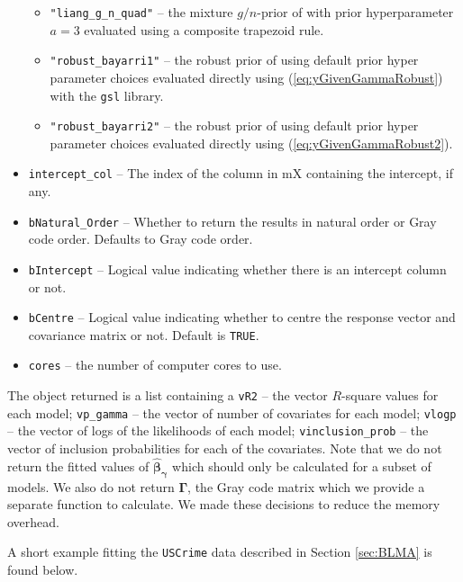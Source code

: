 \documentclass[12pt]{article}
\def\vectorfonttwo{\boldsymbol}
\def\vbeta{{\vectorfonttwo \beta}}               %
\def\vgamma{{\vectorfonttwo \gamma}}             %
\def\matrixfonttwo{\boldsymbol}
\def\mGamma{{\matrixfonttwo \Gamma}}             %
\begin{document}
\begin{itemize}
\begin{itemize}
		\item {\tt "liang\_g\_n\_quad"} -- the mixture $g/n$-prior of \cite{Liang2008} with prior hyperparameter $a=3$ evaluated using a composite trapezoid rule.
		
		\item {\tt "robust\_bayarri1"} -- the robust prior of \cite{Bayarri2012}
		using default prior hyper parameter choices evaluated directly using 
		(\ref{eq:yGivenGammaRobust}) with the {\tt gsl} library.
		
		\item {\tt "robust\_bayarri2"} -- the robust prior of \cite{Bayarri2012}
		using default prior hyper parameter choices evaluated directly using 
		(\ref{eq:yGivenGammaRobust2}).
	
	\end{itemize}
	\item {\tt intercept\_col} --	The index of the column in mX containing the intercept, if any.
	
	\item {\tt bNatural\_Order} --
	Whether to return the results in natural order or Gray code order. 
	Defaults to Gray code order.
	
	\item {\tt bIntercept} -- Logical value indicating whether there is an intercept column or not.
	
	\item {\tt bCentre} --	
	Logical value indicating whether to centre the response vector and covariance matrix or not. Default is {\tt TRUE}.
	
	\item {\tt cores} -- the number of computer cores to use.
\end{itemize}

\noindent 
The object returned is a 
list containing a {\tt vR2} -- the vector $R$-square values for each model; 
{\tt vp\_gamma} -- the vector of number of covariates for each model;
{\tt vlogp} -- the vector of logs of the likelihoods of each model; 
{\tt vinclusion\_prob} -- the vector of inclusion probabilities for each of the covariates. Note that we do not return the fitted values of 
$\widehat{\vbeta}_{\vgamma}$ which should only be calculated
for a subset of models. We also do not return $\mGamma$, the Gray code matrix
which we provide a separate function to calculate. We made these decisions
to reduce the memory overhead.

A short example fitting the {\tt USCrime} data described in Section 
\ref{sec:BLMA} is found below.
\end{document}
